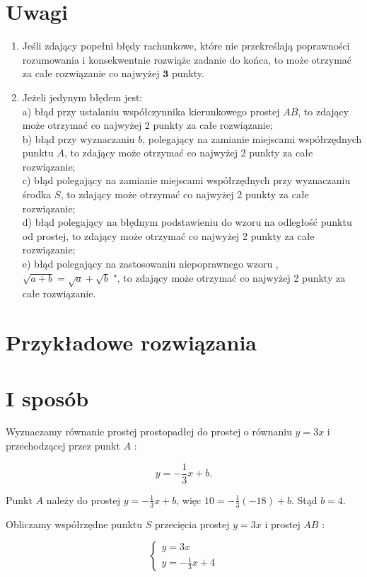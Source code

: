 \documentclass[10pt]{article}
\begin{document}
\section*{Uwagi}
\begin{enumerate}
  \item Jeśli zdający popełni błędy rachunkowe, które nie przekreślają poprawności rozumowania i konsekwentnie rozwiąże zadanie do końca, to może otrzymać za całe rozwiązanie co najwyżej $\mathbf{3}$ punkty.
  \item Jeżeli jedynym błędem jest:\\
a) błąd przy ustalaniu współczynnika kierunkowego prostej $A B$, to zdający może otrzymać co najwyżej 2 punkty za całe rozwiązanie;\\
b) błąd przy wyznaczaniu $b$, polegający na zamianie miejscami współrzędnych punktu $A$, to zdający może otrzymać co najwyżej 2 punkty za całe rozwiązanie;\\
c) błąd polegający na zamianie miejscami współrzędnych przy wyznaczaniu środka $S$, to zdający może otrzymać co najwyżej 2 punkty za całe rozwiązanie;\\
d) błąd polegający na błędnym podstawieniu do wzoru na odległość punktu od prostej, to zdający może otrzymać co najwyżej 2 punkty za całe rozwiązanie;\\
e) błąd polegający na zastosowaniu niepoprawnego wzoru , $\sqrt{a+b}=\sqrt{a}+\sqrt{b}$ ", to zdający może otrzymać co najwyżej 2 punkty za całe rozwiązanie.
\end{enumerate}

\section*{Przykładowe rozwiązania}
\section*{I sposób}
Wyznaczamy równanie prostej prostopadłej do prostej o równaniu $y=3 x$ i przechodzącej przez punkt $A$ :

$$
y=-\frac{1}{3} x+b .
$$

Punkt $A$ należy do prostej $y=-\frac{1}{3} x+b$, więc $10=-\frac{1}{3}(-18)+b$. Stąd $b=4$.

Obliczamy współrzędne punktu $S$ przecięcia prostej $y=3 x$ i prostej $A B$ :

$$
\left\{\begin{array}{l}
y=3 x \\
y=-\frac{1}{3} x+4
\end{array}\right.
$$
\end{document}
